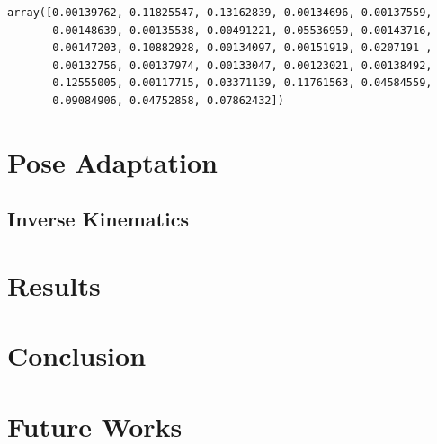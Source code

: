 \documentclass{vgtc}
\newcommand{\prompt}[4]{
        \llap{{\color{#2}[#3]: #4}}\vspace{-1.25em}
    }
\begin{document}
            \begin{tcolorbox}[breakable, boxrule=.5pt, size=fbox, pad at break*=1mm, opacityfill=0]
\prompt{Out}{outcolor}{53}{\hspace{3.5pt}}
\begin{Verbatim}[commandchars=\\\{\}]
array([0.00139762, 0.11825547, 0.13162839, 0.00134696, 0.00137559,
       0.00148639, 0.00135538, 0.00491221, 0.05536959, 0.00143716,
       0.00147203, 0.10882928, 0.00134097, 0.00151919, 0.0207191 ,
       0.00132756, 0.00137974, 0.00133047, 0.00123021, 0.00138492,
       0.12555005, 0.00117715, 0.03371139, 0.11761563, 0.04584559,
       0.09084906, 0.04752858, 0.07862432])
\end{Verbatim}
\end{tcolorbox}
        

    \begin{figure}
        \begin{center}\end{center}
        \caption{}
        \label{}
    \end{figure}
    
    \hypertarget{pose-adaptation}{%
\section{Pose Adaptation}\label{pose-adaptation}}

\hypertarget{inverse-kinematics}{%
\subsection{Inverse Kinematics}\label{inverse-kinematics}}

    \hypertarget{results}{%
\section{Results}\label{results}}

    \hypertarget{conclusion}{%
\section{Conclusion}\label{conclusion}}

    \hypertarget{future-works}{%
\section{Future Works}\label{future-works}}



    
    



    
    
\end{document}
